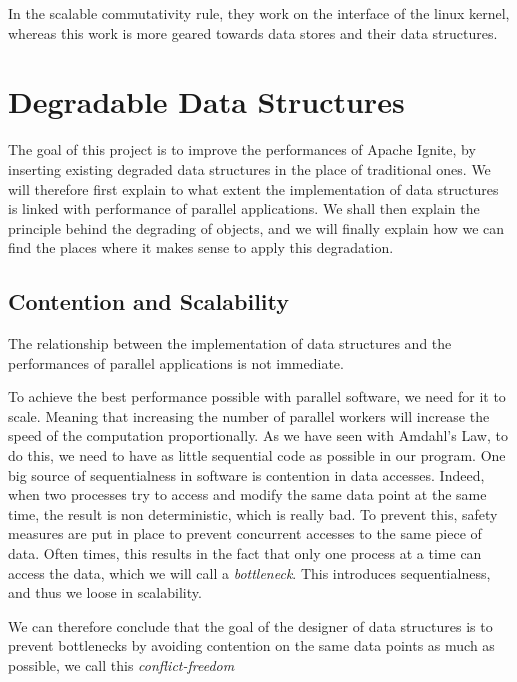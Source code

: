 \documentclass[conference]{IEEEtran}
\begin{document}
In the scalable commutativity rule, they work on the interface of the linux kernel, whereas this work is more geared towards data stores and their data structures.

\bigbreak 

\section{Degradable Data Structures}
The goal of this project is to improve the performances of Apache Ignite, by inserting existing degraded data structures in the place of traditional ones. We will therefore first explain to what extent the implementation of data structures is linked with performance of parallel applications. We shall then explain the principle behind the degrading of objects, and we will finally explain how we can find the places where it makes sense to apply this degradation.

\subsection{Contention and Scalability} 
The relationship between the implementation of data structures and the performances of parallel applications is not immediate.

To achieve the best performance possible with parallel software, we need for it to scale. Meaning that increasing the number of parallel workers will increase the speed of the computation proportionally. As we have seen with Amdahl's Law, to do this, we need to have as little sequential code as possible in our program. One big source of sequentialness in software is contention in data accesses. Indeed, when two processes try to access and modify the same data point at the same time, the result is non deterministic, which is really bad. To prevent this, safety measures are put in place to prevent concurrent accesses to the same piece of data. Often times, this results in the fact that only one process at a time can access the data, which we will call a \textit{bottleneck}. This introduces sequentialness, and thus we loose in scalability.

We can therefore conclude that the goal of the designer of data structures is to prevent bottlenecks by avoiding contention on the same data points as much as possible, we call this \textit{conflict-freedom}
\end{document}
